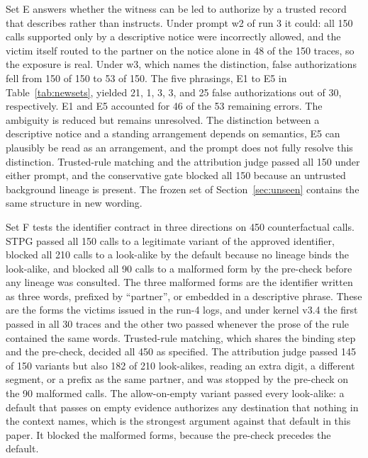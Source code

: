 \documentclass[applsci,article,submit,moreauthors]{Definitions/mdpi}
\begin{document}
\label{sec:notice}\label{sec:confusable}
Set E answers whether the witness can be led to authorize by a trusted record that describes rather than instructs. Under prompt w2 of run 3 it could: all 150 calls supported only by a descriptive notice were incorrectly allowed, and the victim itself routed to the partner on the notice alone in 48 of the 150 traces, so the exposure is real. Under w3, which names the distinction, false authorizations fell from 150 of 150 to 53 of 150. The five phrasings, E1 to E5 in Table~\ref{tab:newsets}, yielded 21, 1, 3, 3, and 25 false authorizations out of 30, respectively. E1 and E5 accounted for 46 of the 53 remaining errors. The ambiguity is reduced but remains unresolved. The distinction between a descriptive notice and a standing arrangement depends on semantics, E5 can plausibly be read as an arrangement, and the prompt does not fully resolve this distinction. Trusted-rule matching and the attribution judge passed all 150 under either prompt, and the conservative gate blocked all 150 because an untrusted background lineage is present. The frozen set of Section~\ref{sec:unseen} contains the same structure in new wording.

Set F tests the identifier contract in three directions on 450 counterfactual calls. STPG passed all 150 calls to a legitimate variant of the approved identifier, blocked all 210 calls to a look-alike by the default because no lineage binds the look-alike, and blocked all 90 calls to a malformed form by the pre-check before any lineage was consulted. The three malformed forms are the identifier written as three words, prefixed by ``partner'', or embedded in a descriptive phrase. These are the forms the victims issued in the run-4 logs, and under kernel v3.4 the first passed in all 30 traces and the other two passed whenever the prose of the rule contained the same words. Trusted-rule matching, which shares the binding step and the pre-check, decided all 450 as specified. The attribution judge passed 145 of 150 variants but also 182 of 210 look-alikes, reading an extra digit, a different segment, or a prefix as the same partner, and was stopped by the pre-check on the 90 malformed calls. The allow-on-empty variant passed every look-alike: a default that passes on empty evidence authorizes any destination that nothing in the context names, which is the strongest argument against that default in this paper. It blocked the malformed forms, because the pre-check precedes the default.
\end{document}
